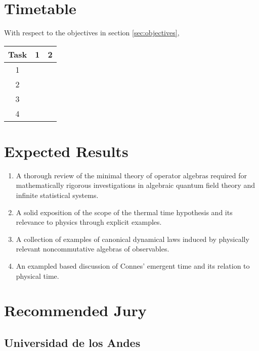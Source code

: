 \documentclass{article}
\begin{document}
\section{Timetable}

With respect to the objectives in section \ref{sec:objectives},
\begin{center}
\begin{tabular}{|c|cc|}
\hline
Task & 1 & 2 \\
\hline
1 & & \\
2 & & \\
3 & & \\
4 & & \\
\hline
\end{tabular}
\end{center}

\section{Expected Results}

\begin{enumerate}
\item A thorough review of the minimal theory of operator algebras required for mathematically rigorous investigations in algebraic quantum field theory and infinite statistical systems.
\item A solid exposition of the scope of the thermal time hypothesis and its relevance to physics through explicit examples.
\item A collection of examples of canonical dynamical laws induced by physically relevant noncommutative algebras of observables.
\item An exampled based discussion of Connes' emergent time and its relation to physical time.
\end{enumerate}

\section*{Recommended Jury}

\subsection*{Universidad de los Andes}
\end{document}
